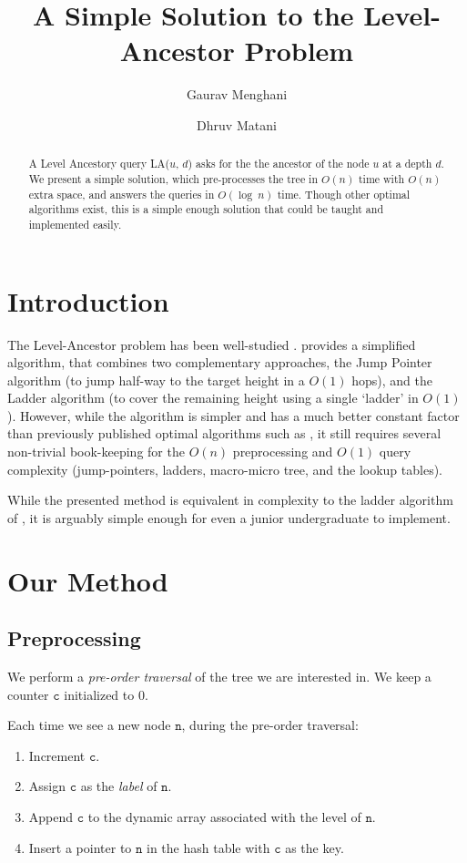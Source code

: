 \documentclass[10pt]{article}
\title{A Simple Solution to the Level-Ancestor Problem}
\author[1]{Gaurav Menghani}
\author[2]{Dhruv Matani}
\affil[1]{Google AI, Mountain View (CA) - 94043}
\affil[2]{Facebook Inc., Menlo Park (CA) - 94025}
\date{\vspace{-5ex}}
\begin{document}
\maketitle
\vspace*{0.25cm}
\begin{abstract}
A Level Ancestory query LA($u$, $d$) asks for the the ancestor of the node $u$ at a depth $d$. We present a simple solution, which pre-processes the tree in $O(n)$ time with $O(n)$ extra space, and answers the queries in $O(\log\ {n})$ time. Though other optimal algorithms exist, this is a simple enough solution that could be taught and implemented easily.

\end{abstract}
\vspace*{0.25cm}

\section{Introduction}
The Level-Ancestor problem has been well-studied \cite{Bender2004, Berkman1994, Dietz1991}. \cite{Bender2004} provides a simplified algorithm, that combines two complementary approaches, the Jump Pointer algorithm (to jump half-way to the target height in a $O(1)$ hops), and the Ladder algorithm (to cover the remaining height using a single `ladder' in $O(1)$). However, while the algorithm is simpler and has a much better constant factor than previously published optimal algorithms such as \cite{Berkman1994}, it still requires several non-trivial book-keeping for the $O(n)$ preprocessing and $O(1)$ query complexity (jump-pointers, ladders, macro-micro tree, and the lookup tables).

While the presented method is equivalent in complexity to the ladder algorithm of \cite{Bender2004}, it is arguably simple enough for even a junior undergraduate to implement.

\section{Our Method}

\subsection{Preprocessing}
We perform a \textit{pre-order traversal} of the tree we are
interested in. We keep a counter $\mathtt{c}$ initialized to 0. 

Each time we see a new node $\mathtt{n}$, during the pre-order traversal:
\begin{enumerate}
    \item Increment $\mathtt{c}$.
    \item Assign $\mathtt{c}$ as the \textit{label} of $\mathtt{n}$.
    \item Append $\mathtt{c}$ to the dynamic array associated with the level of $\mathtt{n}$.
    \item Insert a pointer to $\mathtt{n}$ in the hash table with $\mathtt{c}$ as the key.
\end{enumerate}
\end{document}
